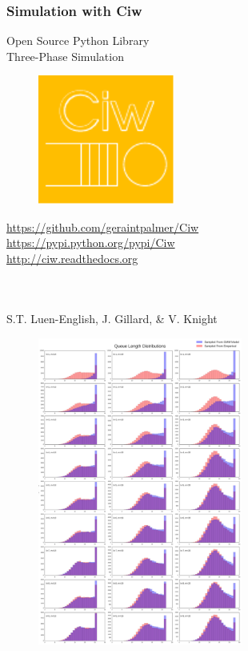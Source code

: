 \documentclass[xcolor={table}]{beamer}
\begin{document}
\begin{frame}
\frametitle{Simulation with Ciw}
\begin{center}
Open Source Python Library\\
Three-Phase Simulation\\
\begin{figure}
\includegraphics[width=0.4\textwidth]{logo}
\end{figure}
{\tiny
\url{https://github.com/geraintpalmer/Ciw}\\
\url{https://pypi.python.org/pypi/Ciw}\\
\url{http://ciw.readthedocs.org}\\}
\end{center}
\end{frame}

\begin{frame}
\begin{columns}

\fontsize{8.5pt}{10pt} \inputminted{python}{ciwexample.py}
\end{columns}
\end{frame}

\begin{frame}
\begin{center}
S.T. Luen-English, J. Gillard, \& V. Knight
\begin{figure}
\includegraphics[width=0.6\textwidth]{samswork}
\end{figure}
\end{center}
\end{frame}
\end{document}
